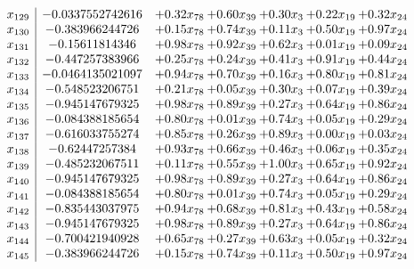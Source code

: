 \documentclass[8pt]{article}
\begin{document}
\[\begin{array}{c| c c@{\hskip 2pt} c@{\hskip 2pt} c@{\hskip 2pt} c@{\hskip 2pt} c@{\hskip 2pt} }
 x_{129}   &  -0.0337552742616 & +  0.32 x_{78} & +  0.60 x_{39} & +  0.30 x_{3} & +  0.22 x_{19} & +  0.32 x_{24}\\
 x_{130}   &  -0.383966244726 & +  0.15 x_{78} & +  0.74 x_{39} & +  0.11 x_{3} & +  0.50 x_{19} & +  0.97 x_{24}\\
 x_{131}   &  -0.15611814346 & +  0.98 x_{78} & +  0.92 x_{39} & +  0.62 x_{3} & +  0.01 x_{19} & +  0.09 x_{24}\\
 x_{132}   &  -0.447257383966 & +  0.25 x_{78} & +  0.24 x_{39} & +  0.41 x_{3} & +  0.91 x_{19} & +  0.44 x_{24}\\
 x_{133}   &  -0.0464135021097 & +  0.94 x_{78} & +  0.70 x_{39} & +  0.16 x_{3} & +  0.80 x_{19} & +  0.81 x_{24}\\
 x_{134}   &  -0.548523206751 & +  0.21 x_{78} & +  0.05 x_{39} & +  0.30 x_{3} & +  0.07 x_{19} & +  0.39 x_{24}\\
 x_{135}   &  -0.945147679325 & +  0.98 x_{78} & +  0.89 x_{39} & +  0.27 x_{3} & +  0.64 x_{19} & +  0.86 x_{24}\\
 x_{136}   &  -0.084388185654 & +  0.80 x_{78} & +  0.01 x_{39} & +  0.74 x_{3} & +  0.05 x_{19} & +  0.29 x_{24}\\
 x_{137}   &  -0.616033755274 & +  0.85 x_{78} & +  0.26 x_{39} & +  0.89 x_{3} & +  0.00 x_{19} & +  0.03 x_{24}\\
 x_{138}   &  -0.62447257384 & +  0.93 x_{78} & +  0.66 x_{39} & +  0.46 x_{3} & +  0.06 x_{19} & +  0.35 x_{24}\\
 x_{139}   &  -0.485232067511 & +  0.11 x_{78} & +  0.55 x_{39} & +  1.00 x_{3} & +  0.65 x_{19} & +  0.92 x_{24}\\
 x_{140}   &  -0.945147679325 & +  0.98 x_{78} & +  0.89 x_{39} & +  0.27 x_{3} & +  0.64 x_{19} & +  0.86 x_{24}\\
 x_{141}   &  -0.084388185654 & +  0.80 x_{78} & +  0.01 x_{39} & +  0.74 x_{3} & +  0.05 x_{19} & +  0.29 x_{24}\\
 x_{142}   &  -0.835443037975 & +  0.94 x_{78} & +  0.68 x_{39} & +  0.81 x_{3} & +  0.43 x_{19} & +  0.58 x_{24}\\
 x_{143}   &  -0.945147679325 & +  0.98 x_{78} & +  0.89 x_{39} & +  0.27 x_{3} & +  0.64 x_{19} & +  0.86 x_{24}\\
 x_{144}   &  -0.700421940928 & +  0.65 x_{78} & +  0.27 x_{39} & +  0.63 x_{3} & +  0.05 x_{19} & +  0.32 x_{24}\\
 x_{145}   &  -0.383966244726 & +  0.15 x_{78} & +  0.74 x_{39} & +  0.11 x_{3} & +  0.50 x_{19} & +  0.97 x_{24}\\

\end{array}\]
\end{document}
